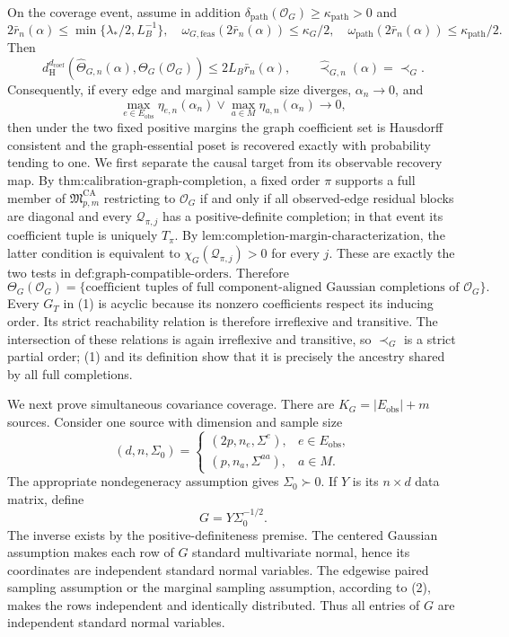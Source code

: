 On the coverage event, assume in addition \(\delta_{\mathrm{path}}(\mathcal O_G)\ge\kappa_{\mathrm{path}}>0\) and
\[
2\bar r_n(\alpha)\le\min\{\lambda_*/2,L_B^{-1}\},
\quad
\omega_{G,\mathrm{feas}}(2\bar r_n(\alpha))\le\kappa_G/2,
\quad
\omega_{\mathrm{path}}(2\bar r_n(\alpha))\le\kappa_{\mathrm{path}}/2.
\]
Then
\[
d_{\mathrm H}^{d_{\mathrm{coef}}}
(\widehat\Theta_{G,n}(\alpha),\Theta_G(\mathcal O_G))
\le2L_B\bar r_n(\alpha),
\qquad
\widehat\prec_{G,n}(\alpha)=\prec_G.
\]
Consequently, if every edge and marginal sample size diverges, \(\alpha_n\to0\), and
\[
\max_{e\in E_{\mathrm{obs}}}\eta_{e,n}(\alpha_n)
\vee\max_{a\in M}\eta_{a,n}(\alpha_n)\longrightarrow0,
\]
then under the two fixed positive margins the graph coefficient set is Hausdorff consistent and the graph-essential poset is recovered exactly with probability tending to one.
We first separate the causal target from its observable recovery map.  By \(\text{thm:calibration-graph-completion}\), a fixed order \(\pi\) supports a full member of \(\mathfrak M_{p,m}^{\mathrm{CA}}\) restricting to \(\mathcal O_G\) if and only if all observed-edge residual blocks are diagonal and every \(\mathcal Q_{\pi,j}\) has a positive-definite completion; in that event its coefficient tuple is uniquely \(T_\pi\).  By \(\text{lem:completion-margin-characterization}\), the latter condition is equivalent to \(\chi_G(\mathcal Q_{\pi,j})>0\) for every \(j\).  These are exactly the two tests in \(\text{def:graph-compatible-orders}\).  Therefore
\[
\Theta_G(\mathcal O_G)
=\{\text{coefficient tuples of full component-aligned Gaussian completions of }\mathcal O_G\}.
\tag{1}
\]
Every \(G_T\) in (1) is acyclic because its nonzero coefficients respect its inducing order.  Its strict reachability relation is therefore irreflexive and transitive.  The intersection of these relations is again irreflexive and transitive, so \(\prec_G\) is a strict partial order; (1) and its definition show that it is precisely the ancestry shared by all full completions.

We next prove simultaneous covariance coverage.  There are \(K_G=|E_{\mathrm{obs}}|+m\) sources.  Consider one source with dimension and sample size
\[
(d,n,\Sigma_0)=
\begin{cases}
(2p,n_e,\Sigma^e),&e\in E_{\mathrm{obs}},\\
(p,n_a,\Sigma^{aa}),&a\in M.
\end{cases}
\tag{2}
\]
The appropriate nondegeneracy assumption gives \(\Sigma_0\succ0\).  If \(Y\) is its \(n\times d\) data matrix, define
\[
G=Y\Sigma_0^{-1/2}.
\tag{3}
\]
The inverse exists by the positive-definiteness premise.  The centered Gaussian assumption makes each row of \(G\) standard multivariate normal, hence its coordinates are independent standard normal variables.  The edgewise paired sampling assumption or the marginal sampling assumption, according to (2), makes the rows independent and identically distributed.  Thus all entries of \(G\) are independent standard normal variables.

